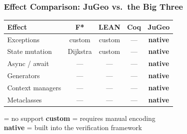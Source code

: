 \begin{frame}
\frametitle{Effect Comparison: JuGeo vs.\ the Big Three}
\begin{center}
\small
\renewcommand{\arraystretch}{1.3}
\begin{tabular}{l c c c c}
  \toprule
  \textbf{Effect} & \textbf{F*} & \textbf{LEAN} & \textbf{Coq} & \textbf{JuGeo} \\
  \midrule
  Exceptions        & custom & custom & --- &
    \textcolor{jugeoGreen}{\textbf{native}} \\
  State mutation     & Dijkstra & custom & --- &
    \textcolor{jugeoGreen}{\textbf{native}} \\
  Async / await     & --- & --- & --- &
    \textcolor{jugeoGreen}{\textbf{native}} \\
  Generators        & --- & --- & --- &
    \textcolor{jugeoGreen}{\textbf{native}} \\
  Context managers   & --- & --- & --- &
    \textcolor{jugeoGreen}{\textbf{native}} \\
  Metaclasses       & --- & --- & --- &
    \textcolor{jugeoGreen}{\textbf{native}} \\
  \bottomrule
\end{tabular}
\end{center}
\vfill
\begin{center}
  \jugmark{---} = no support \quad
  \textbf{custom} = requires manual encoding\\[4pt]
  \textcolor{jugeoGreen}{\textbf{native}} = built into the verification framework
\end{center}
\end{frame}

